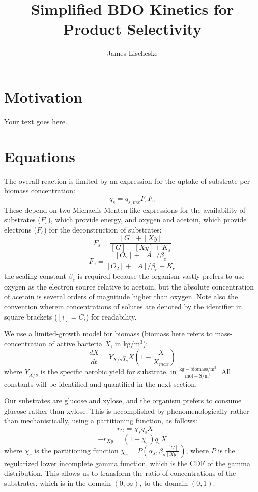 \documentclass[11pt]{article} %
\title{Simplified BDO Kinetics for Product Selectivity}
\author{James Lischeske}
\begin{document}
\maketitle

\section{Motivation}

Your text goes here.

\section{Equations}

The overall reaction is limited by an expression for the uptake of substrate per biomass concentration:
\begin{equation}
	q_s = q_{s,mx} F_s F_e
\end{equation}
These depend on two Michaelis-Menten-like expressions for the availability of substrates ($F_s$), which provide energy, and oxygen and acetoin, which provide electrons ($F_e$) for the deconstruction of substrates:
\begin{equation}
	F_s = \frac{[G] + [Xy]}{[G] + [Xy] + K_s}
\end{equation}
\begin{equation}
	F_e = \frac{[O_2] +  [A]/\beta_e}{[O_2] +  [A]/\beta_e + K_e}
\end{equation}
the scaling constant $\beta_e$ is required because the organism vastly prefers to use oxygen as the electron source relative to acetoin, but the absolute concentration of acetoin is several orders of magnitude higher than oxygen. Note also the convention wherein concentrations of solutes are denoted by the identifier in square brackets ($[i] = C_i$) for readability. 

We use a limited-growth model for biomass (biomass here refers to mass-concentration of active bacteria $X$, in $\mathrm{kg/m^3}$):
\begin{equation}
	\frac{d X}{d t} = Y_{X/s} q_s X (1 - \frac{X}{X_{max}})
\end{equation}
where $Y_{X/s}$ is the specific aerobic yield for substrate, in $\mathrm{\frac{kg-biomass/m^3}{mol-S/m^3}}$. All constants will be identified and quantified in the next section.

Our substrates are glucose and xylose, and the organism prefers to consume glucose rather than xylose. This is accomplished by phenomenologically rather than mechanistically, using a partitioning function, as follows:
\begin{equation}
	-r_{G} = \chi_s q_s X
\end{equation}
\begin{equation}
	-r_{Xy} = (1-\chi_s) q_s X
\end{equation}
where $\chi_s$ is the partitioning function $\chi_s = P(\alpha_s, \beta_s \frac{[G]}{[Xy]})$, where $P$ is the regularized lower incomplete gamma function, which is the CDF of the gamma distribution. This allows us to transform the ratio of concentrations of the substrates, which is in the domain $(0, \infty)$, to the domain $(0,1)$. 
\end{document}

